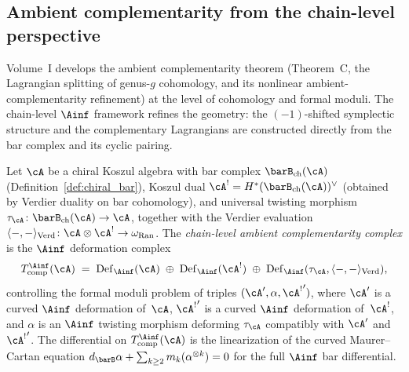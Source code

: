 
\providecommand{\fn}{\mathfrak{n}}
\providecommand{\fb}{\mathfrak{b}}
\providecommand{\fh}{\mathfrak{h}}
\providecommand{\fsl}{\mathfrak{sl}}
\providecommand{\Bl}{\operatorname{Bl}}
\providecommand{\cN}{\mathcal{N}}
\providecommand{\SL}{\mathrm{SL}}
\providecommand{\fso}{\mathfrak{so}}
\providecommand{\fsp}{\mathfrak{sp}}

\subsection{Ambient complementarity from the chain-level perspective}
\label{sec:ambient-complementarity-chain-level}

Volume~I develops the ambient complementarity theorem
(Theorem~C, the Lagrangian splitting of genus-$g$ cohomology, and its nonlinear ambient-complementarity refinement)
at the level of cohomology and formal moduli.
The chain-level $\Ainf$ framework refines the geometry: the
$(-1)$-shifted symplectic structure and the complementary
Lagrangians are constructed directly from the bar complex and its
cyclic pairing.

\begin{definition}
\label{def:chain-level-ambient-complex}
Let $\cA$ be a chiral Koszul algebra with bar complex
$\barB_{\mathrm{ch}}(\cA)$
(Definition~\ref{def:chiral_bar}), Koszul dual
$\cA^! = H^*(\barB_{\mathrm{ch}}(\cA))^\vee$
(obtained by Verdier duality on bar cohomology), and
universal twisting morphism
$\tau_\cA \colon \barB_{\mathrm{ch}}(\cA) \to \cA$, together with
the Verdier evaluation
$\langle-,-\rangle_{\mathrm{Verd}}\colon
\cA\otimes\cA^!\to\omega_{\operatorname{Ran}}$.
The \emph{chain-level ambient complementarity complex} is the
$\Ainf$ deformation complex
\[
T_{\mathrm{comp}}^{\Ainf}(\cA)
\;=\;
\mathrm{Def}_{\Ainf}(\cA)
\;\oplus\;
\mathrm{Def}_{\Ainf}(\cA^!)
\;\oplus\;
\mathrm{Def}_{\Ainf}(\tau_\cA,\langle-,-\rangle_{\mathrm{Verd}}),
\]
controlling the formal moduli problem of triples
$({\cA}', \alpha, {\cA^!}')$, where ${\cA}'$ is a curved
$\Ainf$ deformation of~$\cA$, ${\cA^!}'$ is a curved
$\Ainf$ deformation of~$\cA^!$, and $\alpha$ is an $\Ainf$
twisting morphism deforming $\tau_\cA$ compatibly with
${\cA}'$ and~${\cA^!}'$. The differential on
$T_{\mathrm{comp}}^{\Ainf}(\cA)$ is the linearization of
the curved Maurer--Cartan equation
$d_{\barB}\alpha
+ \sum_{k \ge 2} m_k(\alpha^{\otimes k}) = 0$
for the full $\Ainf$ bar differential.
\end{definition}

